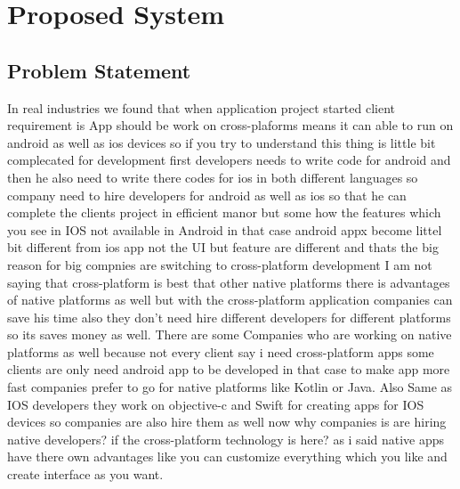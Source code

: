 \documentclass[12pt,a4paper]{report}
\begin{document}
\chapter{Proposed System}
\section{Problem Statement}
 In real industries we found that when application project started client requirement is App should be work on cross-plaforms means it can able to run on android as well as ios devices so if you try to understand this thing is little bit complecated for development first developers needs to write code for android and then he also need to write there codes for ios in both different languages so company need to hire developers for android as well as ios so that he can complete the clients project in efficient manor but some how the features which you see in IOS not available in Android in that case android appx become littel bit different from ios app not the UI but feature are different and thats the big reason for big compnies are switching to cross-platform development I am not saying that cross-platform is best that other native platforms there is advantages  of native platforms as well but with the cross-platform application companies can save his time also they don't need hire different developers for different platforms so its saves money as well. There are some Companies who are working on native platforms as well because not every client say i need cross-platform apps some clients are only need android app to be developed in that case to make app more fast companies prefer to go for native platforms like Kotlin or Java. Also Same as IOS developers they work on objective-c and Swift for creating apps for IOS devices so companies are also hire them as well now why companies is are hiring native developers? if the cross-platform technology is here? as i said native apps have there own advantages like you can customize everything which you like and create interface as you want.

\newpage
\end{document}
